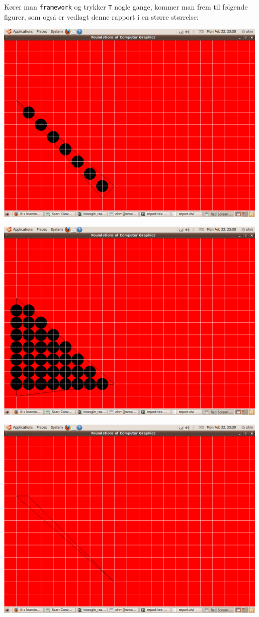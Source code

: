 \documentclass[a4paper, 10pt]{article}
\begin{document}
Kører man \texttt{framework} og trykker \texttt{T} nogle gange, kommer man frem til følgende figurer, som også er vedlagt denne rapport i en større størrelse:

\begin{center}
\centering
\includegraphics[width=0.99\textwidth]{triangle1.png}
\end{center}

\begin{center}
\centering
\includegraphics[width=0.99\textwidth]{triangle2.png}
\end{center}

\begin{center}
\centering
\includegraphics[width=0.99\textwidth]{triangle3.png}
\end{center}
\end{document}
